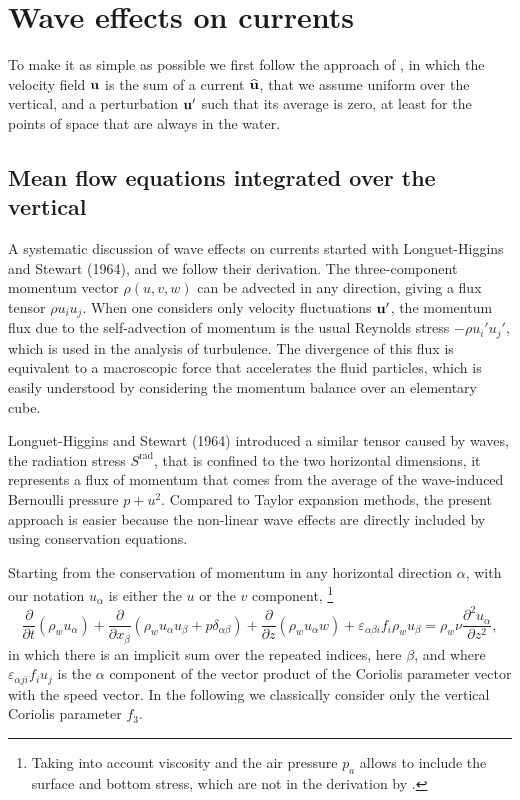 \section{Wave effects on currents}
To make it as simple as possible we first follow the approach of \cite{Phillips1977}, in which the velocity field  $\mathbf{u}$ is the sum of a current  $\widehat{\mathbf{u}}$, that we assume 
uniform over the vertical, and a perturbation $\mathbf{u}'$ such that its  average is zero, at least for the points of space that are always in the water.  

\subsection{Mean flow equations integrated over the vertical}
A systematic discussion of wave effects on currents started with Longuet-Higgins and
Stewart (1964\nocite{Longuet-Higgins&Stewart1964}), and we follow their derivation. The three-component momentum vector $\rho (u,v,w)$ can be advected in any direction, 
giving a flux tensor $\rho u_i u_j$.  When one considers only velocity fluctuations $\mathbf{u}'$, the momentum flux due to the self-advection of momentum 
is the usual Reynolds stress $-\rho u_i' u_j'$, which is used in the analysis of turbulence.  The divergence of this flux is equivalent to 
a macroscopic force that accelerates the fluid particles, which is easily understood by considering the momentum balance over an elementary cube. 
 
Longuet-Higgins and
Stewart (1964\nocite{Longuet-Higgins&Stewart1964}) introduced a similar tensor caused by waves, the radiation stress $S^{\mathrm{rad}}$, that is confined to the two horizontal dimensions, 
it represents a flux of 
momentum that comes from the average of the wave-induced Bernoulli pressure $p+u^2$. Compared to Taylor expansion methods, the present 
approach is easier because the non-linear wave effects are directly included by using conservation equations. 


Starting from the conservation of momentum in any horizontal direction $\alpha$, with our notation $u_\alpha$ is either the $u$ or the $v$ component, 
\footnote{Taking into account viscosity and the air pressure  $p_a$ 
allows to include the surface and bottom stress, which are not in the derivation by \cite[][page 62]{Phillips1977}.} 
\begin{equation}
 \frac{\partial }{\partial t} \left(\rho_w u_\alpha\right)+ \frac{\partial }{\partial x_\beta} 
\left(\rho_w u_\alpha u_\beta + p \delta_{\alpha \beta} \right)
+ \frac{\partial }{\partial z} \left(\rho_w u_\alpha w \right)  + \varepsilon_{\alpha \beta i} f_i \rho_w u_\beta = \rho_w \nu \frac{\partial^2 u_\alpha}{\partial z^2},\label{NavierStokes_horiz}
\end{equation}
in which there is an implicit sum over the repeated indices, here $\beta$, and where  $\varepsilon_{\alpha j i} f_i u_j$ 
is the $\alpha$  component of the vector product of the Coriolis parameter vector with the speed vector. In the following we classically 
consider only the vertical Coriolis parameter  $f_3$.


